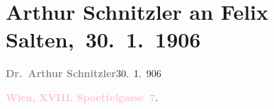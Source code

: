 

\renewcommand{\erwaehntePersonen}{Personen: Hermann Bahr, Otto Brahm, Felix Salten, Albert von Speidel}
\renewcommand{\erwaehnteInstitutionen}{Institutionen: Nationaltheater München}
\renewcommand{\erwaehnteOrte}{Orte: Berlin, Edmund-Weiß-Gasse 7, Kantstraße, Lessing-Theater, Wien}
\renewcommand{\erwaehnteWerke}{Werke: Der Ruf des Lebens. Schauspiel in drei Akten}
\section[ Arthur Schnitzler an Felix Salten, 30. 1. 1906]{Arthur Schnitzler an Felix Salten, 30. 1. 1906}
\nopagebreak{}
\rehead{ }\normalsize\beginnumbering{}
\toendnotes[C]{\smallbreak\pagebreak[2]}
\toendnotes[C]{\smallbreak}
\pstart
           \noindent{}{\pb}\textcolor{gray}{\textbf{Dr. Arthur Schnitzler}}\hfill 30. 1. 906\pend
           
\pstart
           \textcolor{gray}{\textbf{\textcolor{pink}{Wien, XVIII. Spoettelgasse 7}{}\ledrightnote{\textcolor{pink}{Edmund-Weiß-Gasse 7}}.}}\pend
           
